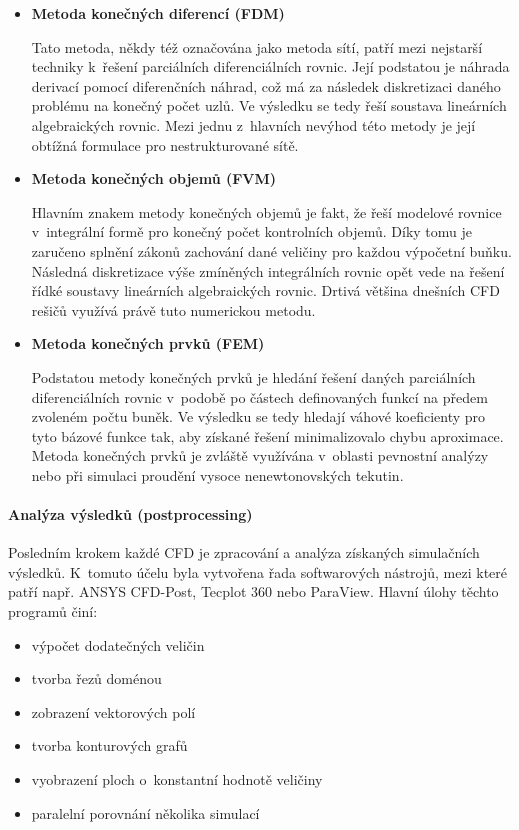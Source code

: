 \begin{itemize}[itemsep=0pt,parsep=0pt,partopsep=0pt,topsep=0pt]
  \item \textbf{Metoda konečných diferencí (FDM)}
  
  Tato metoda, někdy též označována jako metoda sítí, patří mezi nejstarší techniky k~řešení parciálních diferenciálních rovnic. Její podstatou je náhrada derivací pomocí diferenčních náhrad, což má za následek diskretizaci daného problému na konečný počet uzlů. Ve výsledku se tedy řeší soustava lineárních algebraických rovnic. Mezi jednu z~hlavních nevýhod této metody je její obtížná formulace pro nestrukturované sítě. 
  
  \item \textbf{Metoda konečných objemů (FVM)}
  
  Hlavním znakem metody konečných objemů je fakt, že řeší modelové rovnice v~integrální formě pro konečný počet kontrolních objemů. Díky tomu je zaručeno splnění zákonů zachování dané veličiny pro každou výpočetní buňku. Následná diskretizace výše zmíněných integrálních rovnic opět vede na řešení řídké soustavy lineárních algebraických rovnic. Drtivá většina dnešních CFD rešičů využívá právě tuto numerickou metodu. 
  
  \item \textbf{Metoda konečných prvků (FEM)}
  
  Podstatou metody konečných prvků je hledání řešení daných parciálních diferenciálních rovnic v~podobě po částech definovaných funkcí na předem zvoleném počtu buněk. Ve výsledku se tedy hledají váhové koeficienty pro tyto bázové funkce tak, aby získané řešení minimalizovalo chybu aproximace. Metoda konečných prvků je zvláště využívána v~oblasti pevnostní analýzy nebo při simulaci proudění vysoce nenewtonovských tekutin.  
\end{itemize}

\paragraph{Analýza výsledků (postprocessing)}
Posledním krokem každé CFD je zpracování a analýza získaných simulačních výsledků. K~tomuto účelu byla vytvořena řada softwarových nástrojů, mezi které patří např. ANSYS CFD-Post, Tecplot 360 nebo ParaView. Hlavní úlohy těchto programů činí:

\begin{itemize}[itemsep=0pt,parsep=0pt,partopsep=0pt,topsep=0pt]
  \item výpočet dodatečných veličin
  \item tvorba řezů doménou
  \item zobrazení vektorových polí
  \item tvorba konturových grafů
  \item vyobrazení ploch o~konstantní hodnotě veličiny
  \item paralelní porovnání několika simulací
\end{itemize}

